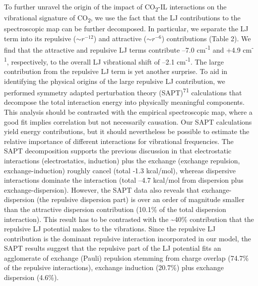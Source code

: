 \documentclass[]{article}
\begin{document}
To further unravel the origin of the impact of CO\textsubscript{2}-IL
interactions on the vibrational signature of CO\textsubscript{2}, we use
the fact that the LJ contributions to the spectroscopic map can be
further decomposed. In particular, we separate the LJ term into its
repulsive (\({\sim r}^{- 12}\)) and attractive (\(\sim r^{- 6}\))
contributions (Table 2). We find that the attractive and repulsive LJ
terms contribute --7.0 cm\textsuperscript{-1} and +4.9
cm\textsuperscript{-1}, respectively, to the overall LJ vibrational
shift of --2.1 cm\textsuperscript{-1}. The large contribution from the
repulsive LJ term is yet another surprise. To aid in identifying the
physical origins of the large repulsive LJ contribution, we performed
symmetry adapted perturbation theory (SAPT)\textsuperscript{71}
calculations that decompose the total interaction energy into physically
meaningful components. This analysis should be contrasted with the
empirical spectroscopic map, where a good fit implies correlation but
not necessarily causation. Our SAPT calculations yield energy
contributions, but it should nevertheless be possible to estimate the
relative importance of different interactions for vibrational
frequencies. The SAPT decomposition supports the previous discussion in
that electrostatic interactions (electrostatics, induction) plus the
exchange (exchange repulsion, exchange-induction) roughly cancel (total
‑1.3 kcal/mol), whereas dispersive interactions dominate the interaction
(total ­--4.7 kcal/mol from dispersion plus exchange-dispersion).
However, the SAPT data also reveals that exchange-dispersion (the
repulsive dispersion part) is over an order of magnitude smaller than
the attractive dispersion contribution (10.1\% of the total dispersion
interaction). This result has to be contrasted with the
\textasciitilde{}40\% contribution that the repulsive LJ potential makes
to the vibrations. Since the repulsive LJ contribution is the dominant
repulsive interaction incorporated in our model, the SAPT results
suggest that the repulsive part of the LJ potential fits an agglomerate
of exchange (Pauli) repulsion stemming from charge overlap (74.7\% of
the repulsive interactions), exchange induction (20.7\%) plus exchange
dispersion (4.6\%).
\end{document}
